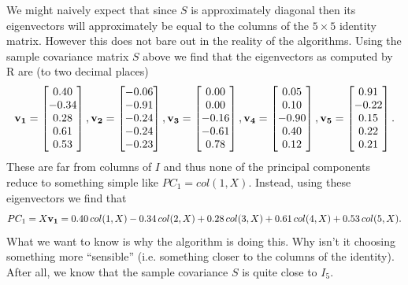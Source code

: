 \documentclass{book}
\begin{document}
We might naively expect that since $S$ is approximately diagonal then its eigenvectors will approximately be equal to the columns of the $5 \times 5$ identity matrix. However this does not bare out in the reality of the algorithms. Using the sample covariance matrix $S$ above we find that the eigenvectors as computed by R are (to two decimal places)
$$
{\bf v_1}=\begin{bmatrix}
0.40\\ -0.34\\0.28\\0.61\\0.53 
\end{bmatrix},
{\bf v_2}=\begin{bmatrix}
 -0.06\\ -0.91\\ -0.24\\ -0.24\\ -0.23
\end{bmatrix},
{\bf v_3}=\begin{bmatrix}
0.00\\  0.00\\ -0.16\\ -0.61\\  0.78
\end{bmatrix},
{\bf v_4}=\begin{bmatrix}
0.05\\  0.10\\ -0.90\\  0.40\\  0.12
\end{bmatrix},
{\bf v_5}=\begin{bmatrix}
0.91\\ -0.22\\  0.15\\  0.22\\  0.21
\end{bmatrix}.
$$
These are far from columns of $I$ and thus none of the principal components reduce to something simple like $PC_1=col(1,X)$. Instead, using these eigenvectors we find that 
$$
PC_1=X{\bf v_1}=0.40\,col(1,X)-0.34\,col(2,X)+0.28\,col(3,X)+0.61\,col(4,X)+0.53\,col(5,X).
$$
 What we want to know is why the algorithm is doing this. Why isn't it choosing something more ``sensible'' (i.e. something closer to the columns of the identity). After all, we know that the sample covariance $S$ is quite close to $I_5$. 
\end{document}
